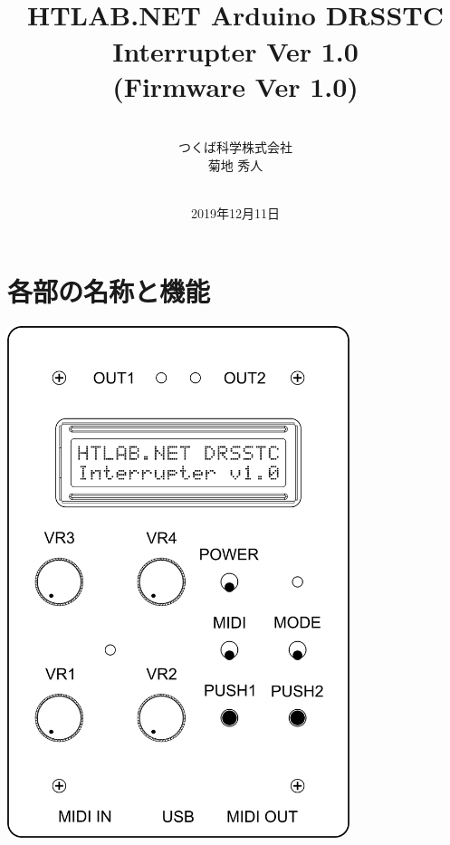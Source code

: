 \documentclass[a4paper,11pt]{jsarticle}
\newcommand{\hwVer}{Ver 1.0}
\newcommand{\fwVer}{Ver 1.0}
\begin{document}
\begin{titlepage}
\title{\vspace*{60mm}\ \\HTLAB.NET Arduino DRSSTC Interrupter \hwVer \\(Firmware \fwVer)}
\author{\vspace*{80mm}\ \\つくば科学株式会社\\菊地 秀人}
\date{\vspace*{20mm}\ \\2019年12月11日}
\maketitle
\thispagestyle{empty}
\end{titlepage}
\clearpage



\section{各部の名称と機能}

\vspace*{10mm}
\begin{center}
\includegraphics[width=100mm]{image/Arduino_Interrupter_v1_Design.png}
\end{center}
\vspace*{10mm}
\end{document}
